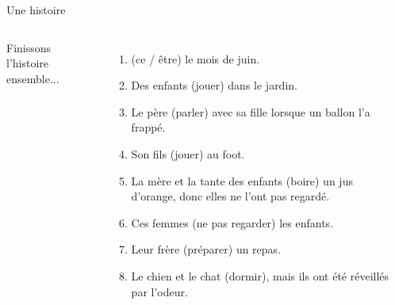 \documentclass{beamer}
\begin{document}
  \begin{frame}{Une histoire}
    \begin{columns}
      \scriptsize
        Finissons l'histoire ensemble...
        \begin{enumerate}
          \item \underline{} (ce / être) le mois de juin.
          \item<3-> Des enfants \underline{} (jouer) dans le jardin.
          \item<5-> Le père \underline{} (parler) avec sa fille lorsque un ballon l'a frappé.
          \item<7-> Son fils \underline{} (jouer) au foot.
          \item<9-> La mère et la tante des enfants \underline{} (boire) un jus d'orange, donc elles ne l'ont pas regardé.
          \item<11-> Ces femmes \underline{} (ne pas regarder) les enfants.
          \item<13-> Leur frère \underline{} (préparer) un repas.
          \item<15-> Le chien et le chat \underline{} (dormir), mais ils ont été réveillés par l'odeur.
        \end{enumerate}
        \begin{minipage}[0.6\textheight]{\linewidth}
          \begin{center}
          \end{center}
        \end{minipage}
    \end{columns}
  \end{frame}
\end{document}
